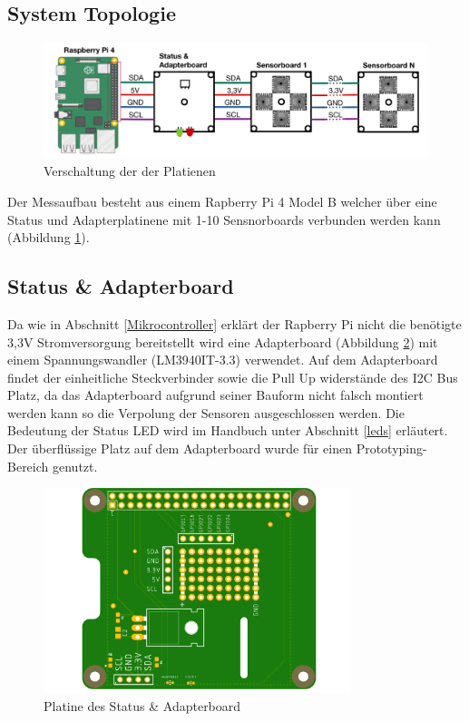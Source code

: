 \subsection{System Topologie}
\begin{figure}[H]
\centering
\includegraphics[width=1\textwidth]{img/System-Topologie.png}
\caption{Verschaltung der der Platienen \cite{Pi_4_Top_view}}
\label{fig:Verschaltung_der_P}
\end{figure}

Der Messaufbau besteht aus einem Rapberry Pi 4 Model B welcher über eine Status und Adapterplatinene mit 1-10 Sensnorboards verbunden werden kann (Abbildung \ref{fig:Verschaltung_der_P}).


\subsection{Status \& Adapterboard}
Da wie in Abschnitt \ref{Mikrocontroller} erklärt der Rapberry Pi nicht die benötigte 3,3V Stromversorgung bereitstellt wird eine Adapterboard (Abbildung \ref{fig:Adapter-Shield}) mit einem Spannungswandler (LM3940IT-3.3) verwendet.
Auf dem Adapterboard findet der einheitliche Steckverbinder sowie die Pull Up widerstände des I2C Bus Platz, da das Adapterboard aufgrund seiner Bauform nicht falsch montiert werden kann so die Verpolung der Sensoren ausgeschlossen werden.
Die Bedeutung der Status LED wird im Handbuch unter Abschnitt \ref{leds} erläutert.\\ 
Der überflüssige Platz auf dem Adapterboard wurde für einen Prototyping-Bereich genutzt.

\begin{figure}[H]
\centering
\includegraphics[width=0.8\textwidth]{img/pi-shield}
\caption{Platine des Status \& Adapterboard}
\label{fig:Adapter-Shield}
\end{figure}
